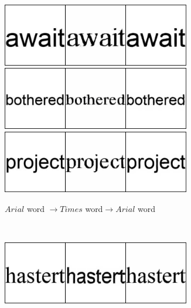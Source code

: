 \documentclass[10pt,twocolumn,letterpaper]{article}
\begin{document}
\begin{figure}[!htb]
     \centering
     \begin{subfigure}[]{0.49\textwidth}
         \centering
         \includegraphics[width=0.9\textwidth]{test_a_2_b_31}\\
         \vspace{0.3cm}
		 \includegraphics[width=0.9\textwidth]{test_a_2_b_55}\\
		 \vspace{0.3cm}
		 \includegraphics[width=0.9\textwidth]{test_a_2_b_341}\\
		 \caption{$Arial$ word $\rightarrow Times$ word$\rightarrow Arial$ word}
         \label{fig:arial2times_word}
     \end{subfigure}
     ~
     \begin{subfigure}[]{0.49\textwidth}
         \centering
         \includegraphics[width=0.9\textwidth]{test_b_2_a_202}\\

\end{subfigure}
\end{figure}
\end{document}

